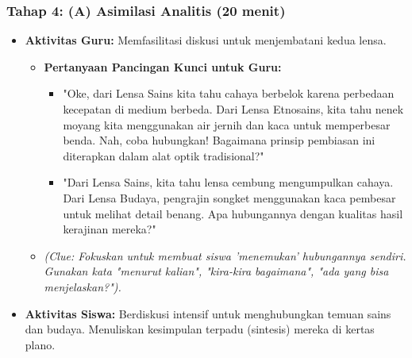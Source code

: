 \documentclass[12pt,a4paper]{article}
\begin{document}
\subsubsection{Tahap 4: (A) Asimilasi Analitis (20 menit)}
\begin{itemize}
\item \textbf{Aktivitas Guru:} Memfasilitasi diskusi untuk menjembatani kedua lensa.
    \begin{itemize}
    \item \textbf{Pertanyaan Pancingan Kunci untuk Guru:}
        \begin{itemize}
        \item "Oke, dari Lensa Sains kita tahu cahaya berbelok karena perbedaan kecepatan di medium berbeda. Dari Lensa Etnosains, kita tahu nenek moyang kita menggunakan air jernih dan kaca untuk memperbesar benda. Nah, coba hubungkan! Bagaimana prinsip pembiasan ini diterapkan dalam alat optik tradisional?"
        \item "Dari Lensa Sains, kita tahu lensa cembung mengumpulkan cahaya. Dari Lensa Budaya, pengrajin songket menggunakan kaca pembesar untuk melihat detail benang. Apa hubungannya dengan kualitas hasil kerajinan mereka?"
        \end{itemize}
    \item \textit{(Clue: Fokuskan untuk membuat siswa 'menemukan' hubungannya sendiri. Gunakan kata "menurut kalian", "kira-kira bagaimana", "ada yang bisa menjelaskan?").}
    \end{itemize}
\item \textbf{Aktivitas Siswa:} Berdiskusi intensif untuk menghubungkan temuan sains dan budaya. Menuliskan kesimpulan terpadu (sintesis) mereka di kertas plano.
\end{itemize}
\end{document}
